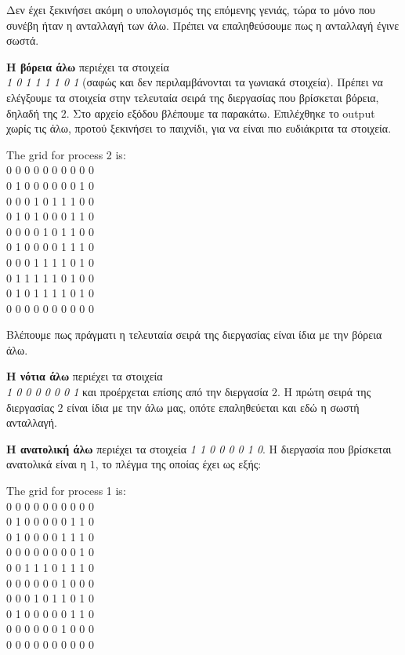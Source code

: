 \begin{multicols}{2}
Δεν έχει ξεκινήσει ακόμη ο υπολογισμός της επόμενης γενιάς, τώρα το μόνο που συνέβη ήταν η ανταλλαγή των άλω. Πρέπει να επαληθεύσουμε πως η ανταλλαγή έγινε σωστά. \par

\textbf{Η βόρεια άλω} περιέχει τα στοιχεία \\ \emph{1 0 1 1 1 1 0 1} (σαφώς και δεν περιλαμβάνονται τα γωνιακά στοιχεία). Πρέπει να ελέγξουμε τα στοιχεία στην τελευταία σειρά της διεργασίας που βρίσκεται βόρεια, δηλαδή της $2$. Στο αρχείο εξόδου βλέπουμε τα παρακάτω. Επιλέχθηκε το output χωρίς τις άλω, προτού ξεκινήσει το παιχνίδι, για να είναι πιο ευδιάκριτα τα στοιχεία. 
\begin{tcolorbox}
The grid for process 2 is: \\
0 0 0 0 0 0 0 0 0 0 \\
0 1 0 0 0 0 0 0 1 0 \\
0 0 0 1 0 1 1 1 0 0 \\
0 1 0 1 0 0 0 1 1 0 \\
0 0 0 0 1 0 1 1 0 0 \\
0 1 0 0 0 0 1 1 1 0 \\
0 0 0 1 1 1 1 0 1 0 \\
0 1 1 1 1 1 0 1 0 0 \\
0 1 0 1 1 1 1 0 1 0 \\
0 0 0 0 0 0 0 0 0 0 \\
\end{tcolorbox}
Βλέπουμε πως πράγματι η τελευταία σειρά της διεργασίας είναι ίδια με την βόρεια άλω. \par
\textbf{Η νότια άλω} περιέχει τα στοιχεία \\ \emph{1 0 0 0 0 0 0 1} και προέρχεται επίσης από την διεργασία $2$. Η πρώτη σειρά της διεργασίας $2$ είναι ίδια με την άλω μας, οπότε επαληθεύεται και εδώ η σωστή ανταλλαγή. \par
\textbf{Η ανατολική άλω} περιέχει τα στοιχεία \emph{1 1 0 0 0 0 1 0}. Η διεργασία που βρίσκεται ανατολικά είναι η $1$, το πλέγμα της οποίας έχει ως εξής:

\begin{tcolorbox}
The grid for process 1 is: \\
0 0 0 0 0 0 0 0 0 0 \\
0 1 0 0 0 0 0 1 1 0 \\
0 1 0 0 0 0 1 1 1 0 \\
0 0 0 0 0 0 0 0 1 0 \\
0 0 1 1 1 0 1 1 1 0 \\
0 0 0 0 0 0 1 0 0 0 \\
0 0 0 1 0 1 1 0 1 0 \\
0 1 0 0 0 0 0 1 1 0 \\
0 0 0 0 0 0 1 0 0 0 \\
0 0 0 0 0 0 0 0 0 0 \\
\end{tcolorbox}


\end{multicols}
